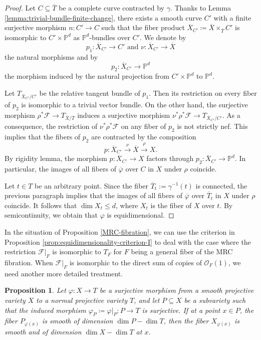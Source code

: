 \documentclass[english,reqno]{amsart}
\newcommand\bbP{{\mathbb P}}
\newcommand\sF{{\mathscr F}}
\newcommand\sO{{\mathscr O}}
\theoremstyle{plain}
\newtheorem{prop}[thm]{Proposition}
\theoremstyle{definition}
\numberwithin{equation}{section} %
\begin{document}
\begin{proof}
	Let $C\subseteq \overline{T}$ be a complete curve contracted by $\gamma$. Thanks to Lemma \ref{lemma:trivial-bundle-finite-change}, there exists a smooth curve $C'$ with a finite surjective morphism $n\colon C'\rightarrow C$ such that the fiber product $\overline{X}_{C'}\coloneqq \overline{X}\times_{\overline{T}} C'$ is isomorphic to   $C'\times \bbP^d$ as $\bbP^d$-bundles over $C'$.
	We denote by $$p_1\colon \overline{X}_{C'} \rightarrow C' \mbox{ and } \nu\colon \overline{X}_{C'} \to \overline{X}$$ the natural morphisms and by  \[
	p_2\colon \overline{X}_{C'}  \rightarrow \bbP^d
	\] the morphism induced by the natural projection from $C'\times \bbP^d$ to $\bbP^d$.
	
	Let $T_{\overline{X}_{C'}/C'}$ be the relative tangent bundle of $p_1$. Then its restriction on every fiber of $p_2$ is isomorphic to a trivial vector bundle.   On the other hand, the surjective morphism $\rho^*\sF\rightarrow T_{\overline{X}/\overline{T}}$  induces a surjective morphism $\nu^*\rho^*\sF\rightarrow T_{\overline{X}_{C'}/C'}$.  As a consequence, the restriction of $\nu^*\rho^*\sF$ on any fiber of $p_2$ is not strictly nef. This implies that the fibers of $p_2$ are contracted by the composition
	\[
	p\colon \overline{X}_{C'}\xrightarrow{\nu} \overline{X} \xrightarrow{\rho} X.
	\]
	By rigidity lemma, the morphism $p\colon \overline{X}_{C'}\rightarrow X$ factors through $p_2\colon \overline{X}_{C'}\rightarrow \bbP^d$. In particular, the images of all fibers of $\overline{\varphi}$ over $C$ in $X$ under $\rho$ coincide.
	
	Let $t\in T$ be an arbitrary point. Since the fiber $\overline{T}_t:= \gamma^{-1}(t)$ is connected, the previous paragraph implies that the images of all fibers of $\overline{\varphi}$ over $\overline{T}_t$ in $X$ under $\rho$ coincide.
	It follows that $\dim X_t\leqslant d$, where $X_t$ is the fiber of $X$ over $t$. By semicontinuity, we obtain that $\varphi$ is equidimensional.
\end{proof}

In the situation of Proposition \ref{MRC-fibration}, we can use the criterion in Proposition \ref{prop:equidimensionality-criterion-I} to deal with the case where the restriction $\sF\vert_F$ is isomorphic to $T_F$ for $F$ being a  general fiber of the MRC fibration. When $\sF|_F$ is isomorphic to the direct sum of copies of $\sO_F(1)$,  we need another more detailed treatment.

\begin{prop}
	\label{prop:equidimensionality-criterion II}
	Let $\varphi\colon X\rightarrow T$ be a surjective morphism  from a smooth projective variety $X$  to a normal projective  variety $T$, and let  $P\subseteq X$ be a  subvariety   such that the induced morphism $\varphi_P\coloneqq \varphi\vert_P\colon P\rightarrow T$ is surjective.
	If  at a point $x\in P$, the fiber $P_{\varphi(x)}$ is smooth of  dimension $\dim P-\dim T$, then the fiber $X_{\varphi(x)}$  is smooth  and of dimension $\dim X-\dim T$ at $x$.
\end{prop}
\end{document}
